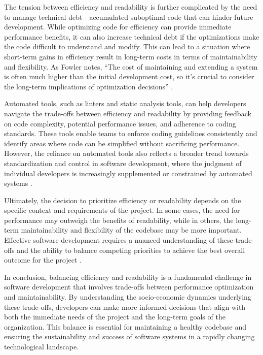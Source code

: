 \begin{refsection}
The tension between efficiency and readability is further complicated by the need to manage technical debt—accumulated suboptimal code that can hinder future development. While optimizing code for efficiency can provide immediate performance benefits, it can also increase technical debt if the optimizations make the code difficult to understand and modify. This can lead to a situation where short-term gains in efficiency result in long-term costs in terms of maintainability and flexibility. As Fowler notes, “The cost of maintaining and extending a system is often much higher than the initial development cost, so it’s crucial to consider the long-term implications of optimization decisions” \cite[pp.~87-89]{Fowler1999}.

Automated tools, such as linters and static analysis tools, can help developers navigate the trade-offs between efficiency and readability by providing feedback on code complexity, potential performance issues, and adherence to coding standards. These tools enable teams to enforce coding guidelines consistently and identify areas where code can be simplified without sacrificing performance. However, the reliance on automated tools also reflects a broader trend towards standardization and control in software development, where the judgment of individual developers is increasingly supplemented or constrained by automated systems \cite[pp.~112-115]{Pressman2019}.

Ultimately, the decision to prioritize efficiency or readability depends on the specific context and requirements of the project. In some cases, the need for performance may outweigh the benefits of readability, while in others, the long-term maintainability and flexibility of the codebase may be more important. Effective software development requires a nuanced understanding of these trade-offs and the ability to balance competing priorities to achieve the best overall outcome for the project \cite[pp.~78-81]{Aho2006}.

In conclusion, balancing efficiency and readability is a fundamental challenge in software development that involves trade-offs between performance optimization and maintainability. By understanding the socio-economic dynamics underlying these trade-offs, developers can make more informed decisions that align with both the immediate needs of the project and the long-term goals of the organization. This balance is essential for maintaining a healthy codebase and ensuring the sustainability and success of software systems in a rapidly changing technological landscape.


\end{refsection}
